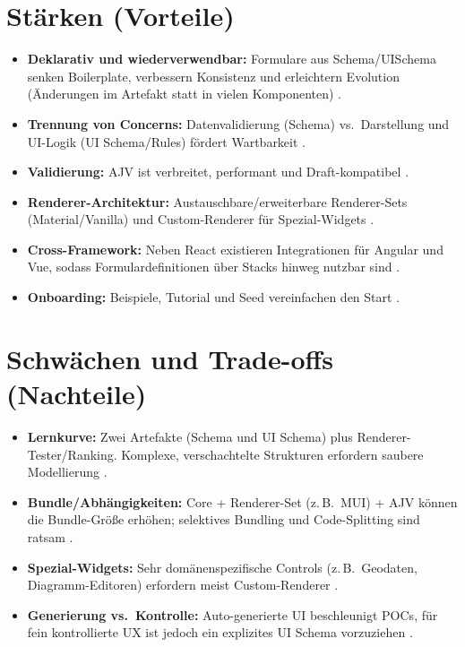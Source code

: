 \documentclass[11pt,a4paper]{article}
\begin{document}
\section{St\"arken (Vorteile)}
\begin{itemize}
  \item \textbf{Deklarativ und wiederverwendbar:} Formulare aus Schema/UISchema senken Boilerplate, verbessern Konsistenz und erleichtern Evolution (\"Anderungen im Artefakt statt in vielen Komponenten) \cite{jsonforms-what,jsonforms-uischema}.
  \item \textbf{Trennung von Concerns:} Datenvalidierung (Schema) vs.\ Darstellung und UI-Logik (UI Schema/Rules) f\"ordert Wartbarkeit \cite{jsonforms-uischema,jsonforms-rules}.
  \item \textbf{Validierung:} AJV ist verbreitet, performant und Draft-kompatibel \cite{ajv-site,ajv-guide}.
  \item \textbf{Renderer-Architektur:} Austauschbare/erweiterbare Renderer-Sets (Material/Vanilla) und Custom-Renderer f\"ur Spezial-Widgets \cite{jsonforms-material,jsonforms-core}.
  \item \textbf{Cross-Framework:} Neben React existieren Integrationen f\"ur Angular und Vue, sodass Formulardefinitionen \"uber Stacks hinweg nutzbar sind \cite{jsonforms-angular,jsonforms-react}.
  \item \textbf{Onboarding:} Beispiele, Tutorial und Seed vereinfachen den Start \cite{jsonforms-examples,jsonforms-getting-started}.
\end{itemize}

\section{Schw\"achen und Trade-offs (Nachteile)}
\begin{itemize}
  \item \textbf{Lernkurve:} Zwei Artefakte (Schema und UI Schema) plus Renderer-Tester/Ranking. Komplexe, verschachtelte Strukturen erfordern saubere Modellierung \cite{jsonforms-uischema}.
  \item \textbf{Bundle/Abh\"angigkeiten:} Core + Renderer-Set (z.\,B.\ MUI) + AJV k\"onnen die Bundle-Gr\"o{\ss}e erh\"ohen; selektives Bundling und Code-Splitting sind ratsam \cite{jsonforms-material,ajv-site}.
  \item \textbf{Spezial-Widgets:} Sehr dom\"anenspezifische Controls (z.\,B.\ Geodaten, Diagramm-Editoren) erfordern meist Custom-Renderer \cite{jsonforms-core}.
  \item \textbf{Generierung vs.\ Kontrolle:} Auto-generierte UI beschleunigt POCs, f\"ur fein kontrollierte UX ist jedoch ein explizites UI Schema vorzuziehen \cite{jsonforms-react}.
\end{itemize}
\end{document}
